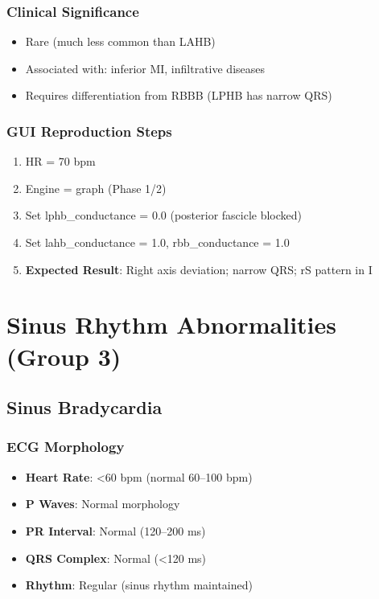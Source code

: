 \documentclass[11pt, a4paper]{article}
\begin{document}
\subsubsection{Clinical Significance}
\begin{itemize}
    \item Rare (much less common than LAHB)
    \item Associated with: inferior MI, infiltrative diseases
    \item Requires differentiation from RBBB (LPHB has narrow QRS)
\end{itemize}

\subsubsection{GUI Reproduction Steps}
\begin{enumerate}
    \item HR = 70 bpm
    \item Engine = graph (Phase 1/2)
    \item Set lphb\_conductance = 0.0 (posterior fascicle blocked)
    \item Set lahb\_conductance = 1.0, rbb\_conductance = 1.0
    \item \textbf{Expected Result}: Right axis deviation; narrow QRS; rS pattern in I
\end{enumerate}

\section{Sinus Rhythm Abnormalities (Group 3)}

\subsection{Sinus Bradycardia}

\subsubsection{ECG Morphology}
\begin{itemize}
    \item \textbf{Heart Rate}: <60 bpm (normal 60--100 bpm)
    \item \textbf{P Waves}: Normal morphology
    \item \textbf{PR Interval}: Normal (120--200 ms)
    \item \textbf{QRS Complex}: Normal (<120 ms)
    \item \textbf{Rhythm}: Regular (sinus rhythm maintained)
\end{itemize}
\end{document}
